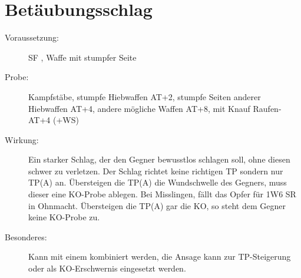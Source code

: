 \section{Betäubungsschlag}
\label{aktion.betaeubungsschlag}
\begin{description}
    \item[Voraussetzung:]
        SF , Waffe mit stumpfer Seite
    \item[Probe:]
        Kampfstäbe, stumpfe Hiebwaffen AT+2, stumpfe Seiten anderer Hiebwaffen AT+4, andere mögliche Waffen AT+8, mit Knauf Raufen-AT+4 (+WS)
    \item[Wirkung:]
        Ein starker Schlag, der den Gegner bewusstlos schlagen soll, ohne diesen schwer zu verletzen.
        Der Schlag richtet keine richtigen TP sondern nur TP(A) an.
        Übersteigen die TP(A) die Wundschwelle des Gegners, muss dieser eine KO-Probe ablegen.
        Bei Misslingen, fällt das Opfer für 1W6 SR in Ohnmacht.
        Übersteigen die TP(A) gar die KO, so steht dem Gegner keine KO-Probe zu.
    \item[Besonderes:]
        Kann mit einem  kombiniert werden, die Ansage kann zur TP-Steigerung oder als KO-Erschwernis eingesetzt werden.
\end{description}
